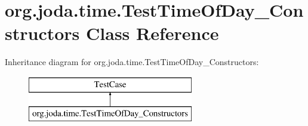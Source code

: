 \hypertarget{classorg_1_1joda_1_1time_1_1_test_time_of_day___constructors}{\section{org.\-joda.\-time.\-Test\-Time\-Of\-Day\-\_\-\-Constructors Class Reference}
\label{classorg_1_1joda_1_1time_1_1_test_time_of_day___constructors}
}
Inheritance diagram for org.\-joda.\-time.\-Test\-Time\-Of\-Day\-\_\-\-Constructors\-:\begin{figure}[H]
\begin{center}
\leavevmode
\includegraphics[height=2.000000cm]{classorg_1_1joda_1_1time_1_1_test_time_of_day___constructors}
\end{center}
\end{figure}
